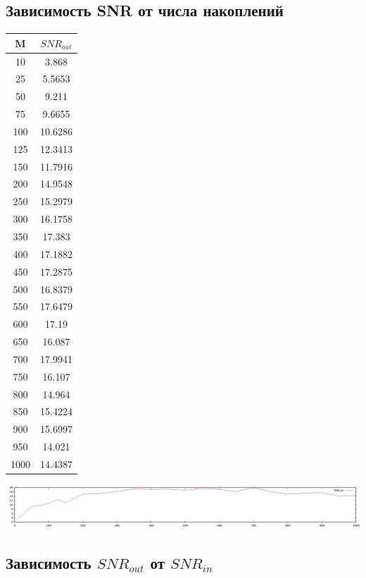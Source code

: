 \subsection{Зависимость SNR от числа накоплений}
\begin{tabular}{|c|c|}
\hline
M & $SNR_{out}$\\ \hline
10 & 3.868\\ \hline
25 & 5.5653\\ \hline
50 & 9.211\\ \hline
75 & 9.6655\\ \hline
100 & 10.6286\\ \hline
125 & 12.3413\\ \hline
150 & 11.7916\\ \hline
200 & 14.9548\\ \hline
250 & 15.2979\\ \hline
300 & 16.1758\\ \hline
350 & 17.383\\ \hline
400 & 17.1882\\ \hline
450 & 17.2875\\ \hline
500 & 16.8379\\ \hline
550 & 17.6479\\ \hline
600 & 17.19\\ \hline
650 & 16.087\\ \hline
700 & 17.9941\\ \hline
750 & 16.107\\ \hline
800 & 14.964\\ \hline
850 & 15.4224\\ \hline
900 & 15.6997\\ \hline
950 & 14.021\\ \hline
1000 & 14.4387\\ \hline
\end{tabular}

\includegraphics[width=\textwidth]{img/r1.png}

\subsection{Зависимость $SNR_{out}$ от $SNR_{in}$}

